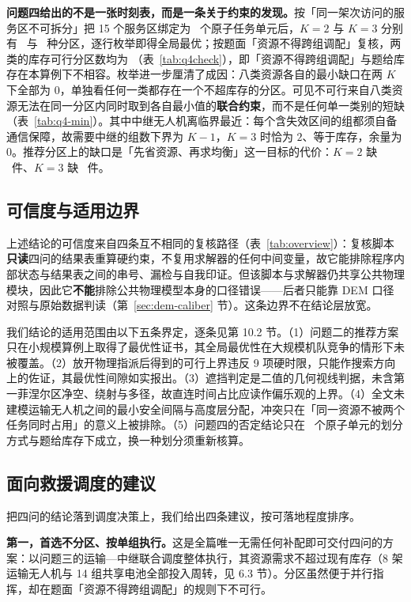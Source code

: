 \textbf{问题四给出的不是一张时刻表，而是一条关于约束的发现。}按「同一架次访问的服务区不可拆分」把 15 个服务区绑定为 \mtQfourUnits\ 个原子任务单元后，$K=2$ 与 $K=3$ 分别有 \mtQfourPartKTwo\ 与 \mtQfourPartKThree\ 种分区，逐行枚举即得全局最优；按题面「资源不得跨组调配」复核，两类的库存可行分区数均为 \mtQfourFeasible（表~\ref{tab:q4check}），即「资源不得跨组调配」与题给库存在本算例下不相容。枚举进一步厘清了成因：八类资源各自的最小缺口在两 $K$ 下全部为 $0$，单独看任何一类都存在一个不超库存的分区。可见不可行来自八类资源无法在同一分区内同时取到各自最小值的\textbf{联合约束}，而不是任何单一类别的短缺（表~\ref{tab:q4-min}）。其中中继无人机离临界最近：每个含失效区间的组都须自备通信保障，故需要中继的组数下界为 $K-1$，$K=3$ 时恰为 $2$、等于库存，余量为 $0$。推荐分区上的缺口是「先省资源、再求均衡」这一目标的代价：$K=2$ 缺 \mtQfourGapSum\ 件、$K=3$ 缺 \mtQfourMinPatchKThree\ 件。

\subsection{可信度与适用边界}

上述结论的可信度来自四条互不相同的复核路径（表~\ref{tab:overview}）：复核脚本\textbf{只读}四问的结果表重算硬约束，不复用求解器的任何中间变量，故它能排除程序内部状态与结果表之间的串号、漏检与自我印证。但该脚本与求解器仍共享公共物理模块，因此它\textbf{不能}排除公共物理模型本身的口径错误——后者只能靠 DEM 口径对照与原始数据判读（第~\ref{sec:dem-caliber} 节）。这条边界不在结论层放宽。

我们结论的适用范围由以下五条界定，逐条见第 10.2 节。（1）问题二的推荐方案只在小规模算例上取得了最优性证书，其全局最优性在大规模机队竞争的情形下未被覆盖。（2）放开物理指派后得到的可行上界违反 9 项硬时限，只能作搜索方向上的佐证，其最优性间隙如实报出。（3）遮挡判定是二值的几何视线判据，未含第一菲涅尔区净空、绕射与多径，故直连时间占比应读作偏乐观的上界。（4）全文未建模运输无人机之间的最小安全间隔与高度层分配，冲突只在「同一资源不被两个任务同时占用」的意义上被排除。（5）问题四的否定结论只在 \mtQfourUnits\ 个原子单元的划分方式与题给库存下成立，换一种划分须重新核算。

\subsection{面向救援调度的建议}

把四问的结论落到调度决策上，我们给出四条建议，按可落地程度排序。

\textbf{第一，首选不分区、按单组执行。}这是全篇唯一无需任何补配即可交付四问的方案：以问题三的运输—中继联合调度整体执行，其资源需求不超过现有库存（8 架运输无人机与 14 组共享电池全部投入周转，见 6.3 节）。分区虽然便于并行指挥，却在题面「资源不得跨组调配」的规则下不可行。

